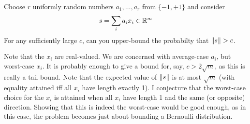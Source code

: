 \documentclass{article}
\begin{document}
Choose $r$ uniformly random numbers $a_1,\ldots, a_r$ from $\{-1,+1\}$ and consider
\[
 s= \sum_i a_i x_i \in {\mathbb{R}}^m
\]
For any sufficiently large $c$, can you upper-bound the probabilty that ${\lVert{s}\rVert} > c$.

Note that the $x_i$ are real-valued. We are concerned with average-case $a_i$, but worst-case $x_i$. It is probably enough to give a bound for, say, $c > 2\sqrt{m}$, as this is really a tail bound. Note that the expected value of ${\lVert{s}\rVert}$ is at most $\sqrt{m}$ (with equality attained iff all $x_i$ have length exactly 1).
I conjecture that the worst-case choice for the $x_i$ is attained when all $x_i$ have length 1 and the same (or opposite) direction. Showing that this is indeed the worst-case would be good enough, as in this case, the problem becomes just about bounding a Bernoulli distribution.
\end{document}
